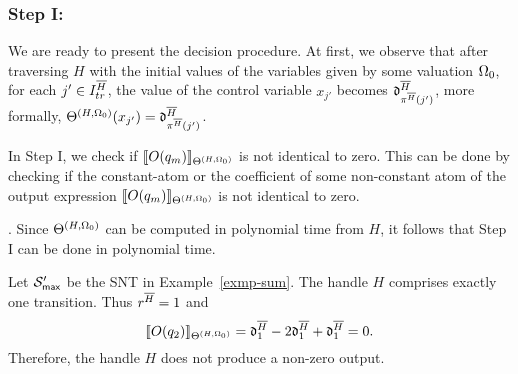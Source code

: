 \subsubsection{Step I:} 
We are ready to present the decision procedure. At first, we observe that  after traversing $H$ with the initial values of the variables given by some valuation $\Omega_0$, for each $j' \in I^{\overline{H}}_{tr}$, the value of the control variable $x_{j'}$ becomes $\mathfrak{d}^{\overline{H}}_{\pi^{\overline{H}}(j')}$,  more formally, $\Theta^{(H,\Omega_0)}(x_{j'})=\mathfrak{d}^{\overline{H}}_{\pi^{\overline{H}}(j')}$.

In Step I, we check if $\llbracket O(q_m)\rrbracket_{\Theta^{(H,\Omega_0)}}$ is not identical to zero.
This can be done by checking if the constant-atom or the coefficient of some non-constant atom of the output expression $\llbracket O(q_m)\rrbracket_{\Theta^{(H,\Omega_0)}}$ is not identical to zero.
%
\bigskip\\
\medskip

. Since $\Theta^{(H,\Omega_0)}$ can be computed in polynomial time from $H$, it follows that Step I can be done in polynomial time.


\begin{example}\label{exmp-step-1}
Let ${\mathcal{S} }'_{\sf max}$ be the SNT in Example~\ref{exmp-sum}. The handle $H$ comprises exactly one transition. Thus $r^{\overline{H}}=1$ and 
\[\llbracket O(q_2)\rrbracket_{\Theta^{(H, \Omega_0)}} = \mathfrak{d}^{\overline{H}}_1 - 2 \mathfrak{d}^{\overline{H}}_1 + \mathfrak{d}^{\overline{H}}_1=0.\]
Therefore, the handle $H$ does not produce a non-zero output.
\end{example}

